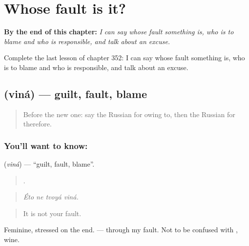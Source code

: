 
\chapter{Whose fault is it?}
\label{ch:ru-whose-fault-is-it}

\begin{chapteropening}
\textbf{By the end of this chapter:} \emph{I can say whose fault something is, who is to blame and who is responsible, and talk about an excuse.}

Complete the last lesson of chapter 352: I can say whose fault something is, who is to blame and who is responsible, and talk about an excuse.
\end{chapteropening}

\section[\texorpdfstring{\ru{вина} (viná)}{вина (viná)}]{ (viná) — guilt, fault, blame}

\label{lesson:RU-C352-vina}



\begin{quote}
Before the new one: say the Russian for owing to, then the Russian for therefore.
\end{quote}

\subsection*{You'll want to know: }
\textbf{} (\emph{viná}) — \textquotedblleft{}guilt, fault, blame\textquotedblright{}.

\begin{quote}
   .
\end{quote}

\begin{quote}
\emph{Éto ne tvoyá viná.}
\end{quote}

\begin{quote}
It is not your fault.
\end{quote}

Feminine, stressed on the end. \emph{  } — through my fault. Not to be confused with \emph{}, wine.

